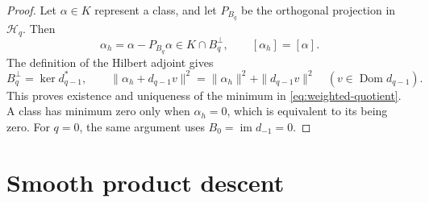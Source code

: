 \documentclass[11pt,reqno]{amsart}
\numberwithin{equation}{section}
\theoremstyle{definition}
\theoremstyle{remark}
\begin{document}
\begin{proof}
Let $\alpha\in K$ represent a class, and let $P_{B_q}$ be the
orthogonal projection in $\mathcal H_q$.  Then
\[
 \alpha_h=\alpha-P_{B_q}\alpha\in K\cap B_q^\perp,\qquad
 [\alpha_h]=[\alpha].
\]
The definition of the Hilbert adjoint gives
\[
 B_q^\perp=\ker d_{q-1}^*,\qquad
 \|\alpha_h+d_{q-1}v\|^2
       =\|\alpha_h\|^2+\|d_{q-1}v\|^2
       \quad(v\in\operatorname{Dom}d_{q-1}).
\]
This proves existence and uniqueness of the minimum in
\eqref{eq:weighted-quotient}.  A class has minimum zero only when
$\alpha_h=0$, which is equivalent to its being zero.  For $q=0$,
the same argument uses $B_0=\operatorname{im}d_{-1}=0$.
\end{proof}


\section{Smooth product descent}\label{sec:smooth-product}
\end{document}
